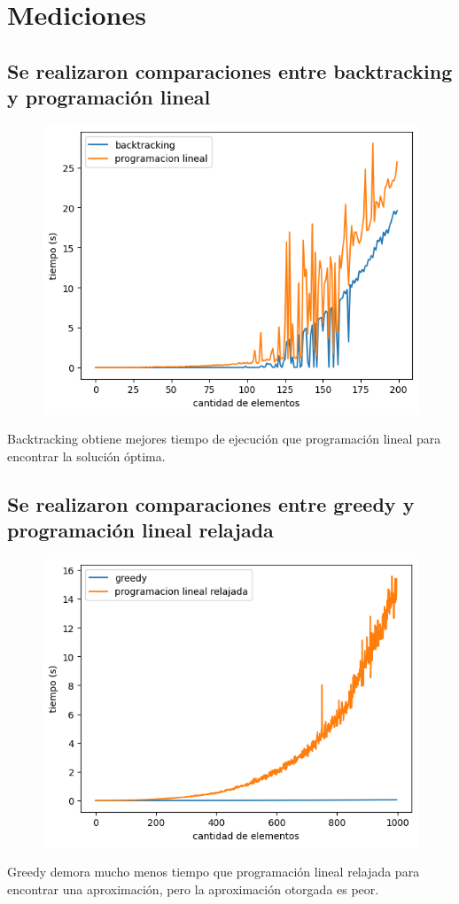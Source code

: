 \section{Mediciones}

\subsection{Se realizaron comparaciones entre backtracking y programación lineal}

\begin{figure}[H]
    \centering
    \includegraphics[width=1\textwidth]{img/backvslp.png}
\end{figure}

Backtracking obtiene mejores tiempo de ejecución que programación lineal para encontrar la solución óptima.

\subsection{Se realizaron comparaciones entre greedy y programación lineal relajada}

\begin{figure}[H]
    \centering
    \includegraphics[width=1\textwidth]{img/greedyvslprx.png}
\end{figure}

Greedy demora mucho menos tiempo que programación lineal relajada para encontrar una aproximación, pero la aproximación otorgada es peor.